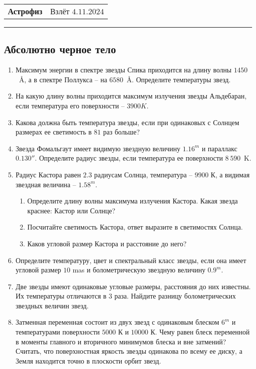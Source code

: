 \documentclass[12pt]{article}
\begin{document}
\begin{tabularx}{\textwidth}{Xr}
{\Large \textbf{Астрофиз}} & Взлёт $4.11.2024$ \\
\end{tabularx}
\noindent\rule{\textwidth}{0.4pt}
\subsection*{Абсолютно черное тело}
\begin{enumerate}
    \item Максимум энергии в спектре звезды Спика приходится на длину волны $1450$~\AA, а в спектре Поллукса -- на $6580$~\AA. Определите температуры звезд.
    \item На какую длину волны приходится максимум излучения звезды Альдебаран, если температура его поверхности -- $3900K$.
    \item Какова должна быть температура звезды, если при одинаковых с Солнцем размерах ее светимость в $81$ раз больше?
    \item Звезда Фомальгаут имеет видимую звездную величину $1.16^m$ и параллакс $0.130''$. Определите радиус звезды, если температура ее поверхности $8~590$~K.
    \item Радиус Кастора равен $2.3$ радиусам Солнца, температура -- $9900$ К, а видимая звездная величина -- $1.58^m$.
    \begin{enumerate}
        \item Определите длину волны максимума излучения Кастора. Какая звезда краснее: Кастор или Солнце?
        \item Посчитайте светимость Кастора, ответ выразите в светимостях Солнца.
        \item Каков угловой размер Кастора и расстояние до него?
    \end{enumerate}
    \item Определите температуру, цвет и спектральный класс звезды, если она имеет угловой размер $10$ mas и болометрическую звездную величину $0.9^m$.
    \item Две звезды имеют одинаковые угловые размеры, расстояния до них известны. Их температуры отличаются в $3$ раза. Найдите разницу болометрических звездных величин звезд.
    \item Затменная переменная состоит из двух звезд с одинаковым блеском $6^m$ и температурами поверхности $5 000$ К и $10 000$ К. Чему равен блеск переменной в моменты главного и вторичного минимумов блеска и вне затмений? Считать, что поверхностная яркость звезды одинакова по всему ее диску, а Земля находится точно в плоскости орбит звезд.

\end{enumerate}
\end{document}

